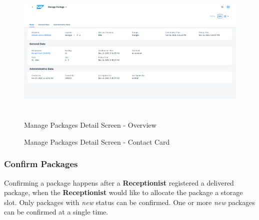 \begin{figure}[H]
	\centering
	\includegraphics[height=200pt]{images/user_doc/managePack/DetailScreen/browse/overview.png}
	\caption{Manage Packages Detail Screen - Overview}
	\label{fig:MPdetailOverview}
\end{figure}

\begin{figure}[H]
	\centering
	\hspace{5pt}
    \caption{Manage Packages Detail Screen - Contact Card}
	\label{fig:MPObjectContactCard}
\end{figure}

\subsubsection{Confirm Packages}

Confirming a package happens after a \textbf{Receptionist} registered a delivered package, when the \textbf{Receptionist} would like to allocate the package a storage slot. Only packages with \textit{new} status can be confirmed. One or more \textit{new} packages can be confirmed at a single time.

